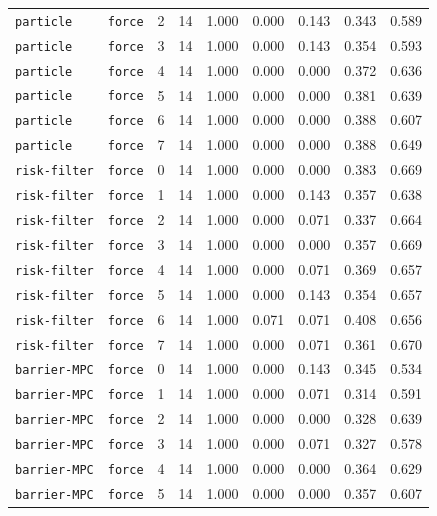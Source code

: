 \documentclass{article}
\begin{document}
\begin{center}
{\begin{tabular}{llllccccc}
\texttt{particle} & \texttt{force} & 2 & 14 & 1.000 & 0.000 & 0.143 & 0.343 & 0.589 \\
\texttt{particle} & \texttt{force} & 3 & 14 & 1.000 & 0.000 & 0.143 & 0.354 & 0.593 \\
\texttt{particle} & \texttt{force} & 4 & 14 & 1.000 & 0.000 & 0.000 & 0.372 & 0.636 \\
\texttt{particle} & \texttt{force} & 5 & 14 & 1.000 & 0.000 & 0.000 & 0.381 & 0.639 \\
\texttt{particle} & \texttt{force} & 6 & 14 & 1.000 & 0.000 & 0.000 & 0.388 & 0.607 \\
\texttt{particle} & \texttt{force} & 7 & 14 & 1.000 & 0.000 & 0.000 & 0.388 & 0.649 \\
\texttt{risk-filter} & \texttt{force} & 0 & 14 & 1.000 & 0.000 & 0.000 & 0.383 & 0.669 \\
\texttt{risk-filter} & \texttt{force} & 1 & 14 & 1.000 & 0.000 & 0.143 & 0.357 & 0.638 \\
\texttt{risk-filter} & \texttt{force} & 2 & 14 & 1.000 & 0.000 & 0.071 & 0.337 & 0.664 \\
\texttt{risk-filter} & \texttt{force} & 3 & 14 & 1.000 & 0.000 & 0.000 & 0.357 & 0.669 \\
\texttt{risk-filter} & \texttt{force} & 4 & 14 & 1.000 & 0.000 & 0.071 & 0.369 & 0.657 \\
\texttt{risk-filter} & \texttt{force} & 5 & 14 & 1.000 & 0.000 & 0.143 & 0.354 & 0.657 \\
\texttt{risk-filter} & \texttt{force} & 6 & 14 & 1.000 & 0.071 & 0.071 & 0.408 & 0.656 \\
\texttt{risk-filter} & \texttt{force} & 7 & 14 & 1.000 & 0.000 & 0.071 & 0.361 & 0.670 \\
\texttt{barrier-MPC} & \texttt{force} & 0 & 14 & 1.000 & 0.000 & 0.143 & 0.345 & 0.534 \\
\texttt{barrier-MPC} & \texttt{force} & 1 & 14 & 1.000 & 0.000 & 0.071 & 0.314 & 0.591 \\
\texttt{barrier-MPC} & \texttt{force} & 2 & 14 & 1.000 & 0.000 & 0.000 & 0.328 & 0.639 \\
\texttt{barrier-MPC} & \texttt{force} & 3 & 14 & 1.000 & 0.000 & 0.071 & 0.327 & 0.578 \\
\texttt{barrier-MPC} & \texttt{force} & 4 & 14 & 1.000 & 0.000 & 0.000 & 0.364 & 0.629 \\
\texttt{barrier-MPC} & \texttt{force} & 5 & 14 & 1.000 & 0.000 & 0.000 & 0.357 & 0.607 \\
\bottomrule
\end{tabular}%
}
\end{center}
\end{document}
